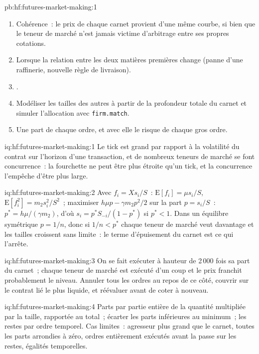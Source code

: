 \begin{solution}{pb:hf:futures-market-making:1}
\begin{enumerate}
\item Cohérence~: le prix de chaque carnet provient d'une même courbe, si bien que le teneur de marché n'est jamais victime d'arbitrage entre ses propres cotations.
\item Lorsque la relation entre les deux matières premières change (panne d'une raffinerie, nouvelle règle de livraison).
\item {}.
\item Modéliser les tailles des autres à partir de la profondeur totale du carnet et simuler l'allocation avec \texttt{firm.match}.
\item Une part de chaque ordre, et avec elle le risque de chaque gros ordre.
\end{enumerate}
\end{solution}

\begin{solution}{iq:hf:futures-market-making:1}
Le tick est grand par rapport à la volatilité du contrat sur l'horizon d'une transaction, et de nombreux teneurs de marché se font concurrence~: la fourchette ne peut être plus étroite qu'un tick,
et la concurrence l'empêche d'être plus large.
\end{solution}

\begin{solution}{iq:hf:futures-market-making:2}
Avec $f_i=Xs_i/S$~: $\mathrm{E}[f_i]=\mu s_i/S$, $\mathrm{E}[f_i^2]=m_2s_i^2/S^2$~; maximiser $h\mu p-\gamma m_2p^2/2$ sur la part $p=s_i/S$~:
$p^\ast=h\mu/(\gamma m_2)$, d'où $s_i=p^\ast S_{-i}/(1-p^\ast)$ si $p^\ast<1$. Dans un équilibre symétrique $p=1/n$, donc si $1/n<p^\ast$ chaque teneur de marché
veut davantage et les tailles croissent sans limite~: le terme d'épuisement du carnet est ce qui l'arrête.
\end{solution}

\begin{solution}{iq:hf:futures-market-making:3}
On se fait exécuter à hauteur de 2\,000 fois sa part du carnet~; chaque teneur de marché est exécuté d'un coup et le prix franchit probablement le niveau. Annuler tous les ordres au repos
de ce côté, couvrir sur le contrat lié le plus liquide, et réévaluer avant de coter à nouveau.
\end{solution}

\begin{solution}{iq:hf:futures-market-making:4}
Parts par partie entière de la quantité multipliée par la taille, rapportée au total~; écarter les parts inférieures au minimum~; les restes par ordre temporel. Cas limites~: agresseur plus grand que le carnet, toutes les parts arrondies à zéro,
ordres entièrement exécutés avant la passe sur les restes, égalités temporelles.
\end{solution}

